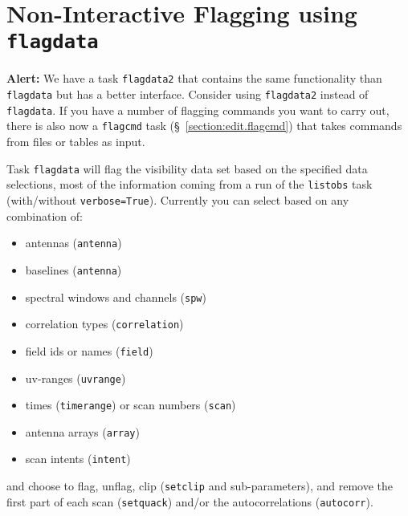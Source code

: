 \section{Non-Interactive Flagging using {\tt flagdata}}
\label{section:edit.flagdata}

{\bf Alert:} We have a task {\tt flagdata2} that contains the same
functionality than {\tt flagdata} but has a better interface. Consider
using {\tt flagdata2} instead of {\tt flagdata}.  If you have a number
of flagging commands you want to carry out, there is also now
a {\tt flagcmd} task (\S~\ref{section:edit.flagcmd}) that takes
commands from files or tables as input.

Task {\tt flagdata} will flag the visibility data set based on the
specified data selections, most of the information coming from a run
of the {\tt listobs} task (with/without {\tt verbose=True}). Currently you can
select based on any combination of: 

\begin{itemize}
   \item antennas ({\tt antenna})
   \item baselines ({\tt antenna})
   \item spectral windows and channels ({\tt spw})
   \item correlation types ({\tt correlation})
   \item field ids or names ({\tt field})
   \item uv-ranges ({\tt uvrange})
   \item times ({\tt timerange}) or scan numbers ({\tt scan})
   \item antenna arrays ({\tt array})
   \item scan intents ({\tt intent})
\end{itemize}

and choose to flag, unflag, clip ({\tt setclip} and sub-parameters), and
remove the first part of each scan ({\tt setquack}) and/or the 
autocorrelations ({\tt autocorr}).

